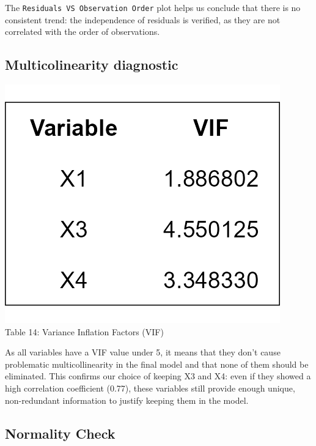 \documentclass[
  11pt,
]{article}
\begin{document}
The \texttt{Residuals\ VS\ Observation\ Order} plot helps us conclude
that there is no consistent trend: the independence of residuals is
verified, as they are not correlated with the order of observations.

\subsection{Multicolinearity
diagnostic}\label{multicolinearity-diagnostic}

\begin{minipage}{0.2\textwidth}
\includegraphics[width=0.9\linewidth]{vif_table.png}\\
\small Table 14: Variance Inflation Factors (VIF)
\end{minipage}
\hfill
\begin{minipage}{0.8\textwidth}
\small
As all variables have a VIF value under 5, it means that they don’t cause problematic multicollinearity in the final model and that none of them should be eliminated. This confirms our choice of keeping X3 and X4: even if they showed a high correlation coefficient (0.77), these variables still provide enough unique, non-redundant information to justify keeping them in the model.
\end{minipage}

\subsection{Normality Check}\label{normality-check}
\end{document}
